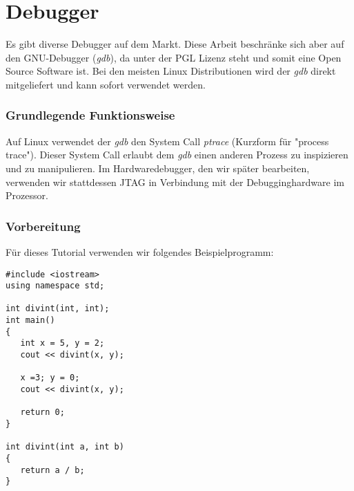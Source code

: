 \chapter{Debugger}

Es gibt diverse Debugger auf dem Markt.
Diese Arbeit beschränke sich aber auf den GNU-Debugger (\textit{gdb}), da unter der PGL Lizenz steht und somit eine Open Source Software ist.
Bei den meisten Linux Distributionen wird der \textit{gdb} direkt mitgeliefert und kann sofort verwendet werden.


% 

\subsection{Grundlegende Funktionsweise}
Auf Linux verwendet der \textit{gdb} den System Call \textit{ptrace} (Kurzform für "process trace").
Dieser System Call erlaubt dem \textit{gdb} einen anderen Prozess zu inspizieren und zu manipulieren.
Im Hardwaredebugger, den wir später bearbeiten, verwenden wir stattdessen JTAG in Verbindung mit der Debugginghardware im Prozessor.

\subsection{Vorbereitung}
Für dieses Tutorial verwenden wir folgendes Beispielprogramm:

\lstset{language=c}
\begin{lstlisting}
#include <iostream>
using namespace std;  

int divint(int, int);  
int main() 
{ 
   int x = 5, y = 2; 
   cout << divint(x, y); 
   
   x =3; y = 0; 
   cout << divint(x, y); 
   
   return 0; 
}  

int divint(int a, int b) 
{ 
   return a / b; 
}  

\end{lstlisting}

